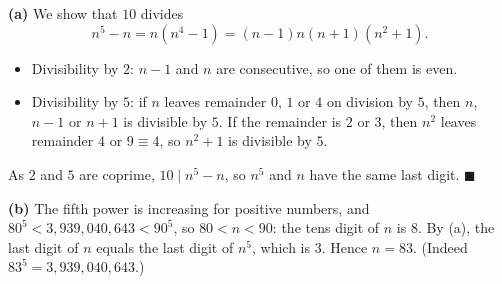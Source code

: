 \textbf{(a)} We show that $10$ divides
\[n^5-n=n\left(n^4-1\right)=(n-1)n(n+1)\left(n^2+1\right).\]
\begin{itemize}
\item Divisibility by $2$: $n-1$ and $n$ are consecutive, so one of them is even.
\item Divisibility by $5$: if $n$ leaves remainder $0$, $1$ or $4$ on division by $5$, then $n$, $n-1$ or $n+1$ is divisible by $5$. If the remainder is $2$ or $3$, then $n^2$ leaves remainder $4$ or $9\equiv4$, so $n^2+1$ is divisible by $5$.
\end{itemize}
As $2$ and $5$ are coprime, $10\mid n^5-n$, so $n^5$ and $n$ have the same last digit. $\blacksquare$

\textbf{(b)} The fifth power is increasing for positive numbers, and $80^5<3{,}939{,}040{,}643<90^5$, so $80<n<90$: the tens digit of $n$ is $8$. By (a), the last digit of $n$ equals the last digit of $n^5$, which is $3$. Hence $n=\boxed{83}$. (Indeed $83^5=3{,}939{,}040{,}643$.)
